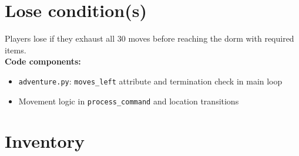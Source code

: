 \documentclass[11pt]{article}
\begin{document}
\section*{Lose condition(s)}
Players lose if they exhaust all 30 moves before reaching the dorm with required items. \\
\textbf{Code components:} 
\begin{itemize}
    \item \texttt{adventure.py}: \texttt{moves\_left} attribute and termination check in main loop
    \item Movement logic in \texttt{process\_command} and location transitions
\end{itemize}

\section*{Inventory}
\end{document}
